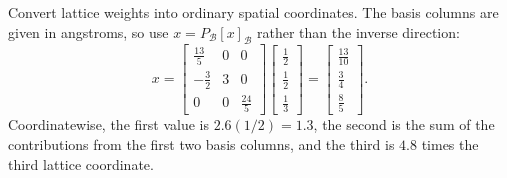 \goal Convert lattice weights into ordinary spatial coordinates.
The basis columns are given in angstroms, so use $x=P_{\mathcal B}[x]_{\mathcal B}$ rather than the inverse direction:
\[x=\left[\begin{array}{rrr}\frac{13}{5}&0&0\\- \frac{3}{2}&3&0\\0&0&\frac{24}{5}\end{array}\right]\left[\begin{array}{r}\frac{1}{2}\\\frac{1}{2}\\\frac{1}{3}\end{array}\right]=\left[\begin{array}{r}\frac{13}{10}\\\frac{3}{4}\\\frac{8}{5}\end{array}\right].\]
Coordinatewise, the first value is $2.6(1/2)=1.3$, the second is the sum of the contributions from the first two basis columns, and the third is $4.8$ times the third lattice coordinate.
